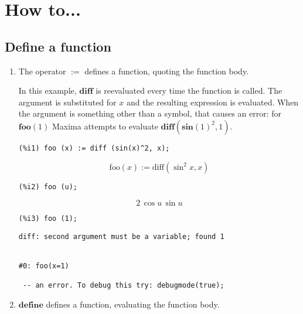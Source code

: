 \documentclass[12pt,leqno]{article}
\begin{document}
\section{How to...}

\subsection{Define a function}

\begin{enumerate}

\item The operator $\mathbf{:=}$ defines a function, quoting the function body.

In this example, $\mathbf{diff}$ is reevaluated every time the function is called.
The argument is substituted for $x$ and the resulting expression is evaluated.
When the argument is something other than a symbol, that causes an error:
for $\mathbf{foo} (1)$ Maxima attempts to evaluate $\mathbf{diff} (\mathbf{sin}(1)^2, 1)$.
\begin{verbatim}
(%i1) foo (x) := diff (sin(x)^2, x);
\end{verbatim}
\begin{equation}
\mathrm{foo}\left(x\right):=\mathrm{diff}\left(\sin ^2x , x\right)\tag{\%o1}
\label{eq:doc-group1-code26-1-1}
\end{equation}
\begin{verbatim}
(%i2) foo (u);
\end{verbatim}
\begin{equation}
2\,\cos u\,\sin u\tag{\%o2}
\label{eq:doc-group1-code26-2-1}
\end{equation}
\begin{verbatim}
(%i3) foo (1);
\end{verbatim}
\begin{Verbatim}
diff: second argument must be a variable; found 1


#0: foo(x=1)

 -- an error. To debug this try: debugmode(true);
\end{Verbatim}


\item $\mathbf{define}$ defines a function, evaluating the function body.


\end{enumerate}
\end{document}
